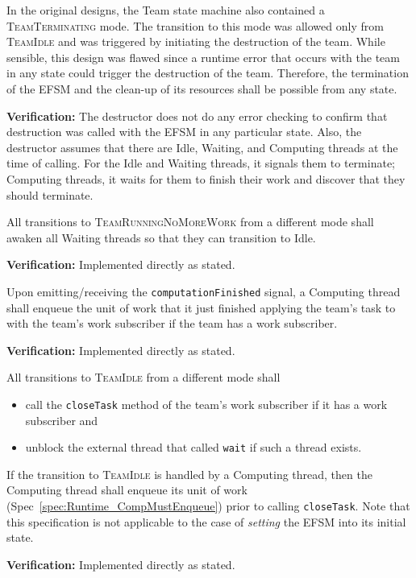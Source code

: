 \documentclass{article}
\newcommand{\TeamIdle}          {\textsc{TeamIdle}}
\newcommand{\TeamRunningNoMoreWork} {\textsc{TeamRunningNoMoreWork}}
\newcommand{\TeamTerminating}   {\textsc{TeamTerminating}}
\begin{document}
\begin{spec}
In the original designs, the Team state machine also contained a
{\TeamTerminating} mode.  The transition to this mode was allowed only from
{\TeamIdle} and was triggered by initiating the destruction of the team.  While
sensible, this design was flawed since a runtime error that occurs with the team
in any state could trigger the destruction of the team.  Therefore, the
termination of the EFSM and the clean-up of its resources shall be possible from
any state.
\end{spec}
\textbf{Verification:}\hspace{0.125in}  The destructor does not do any error
checking to confirm that destruction was called with the EFSM in any particular
state.  Also, the destructor assumes that there are Idle, Waiting, and Computing
threads at the time of calling.  For the Idle and Waiting threads, it signals 
them to terminate; Computing threads, it waits for them to finish their work and
discover that they should terminate.

\begin{spec}
\label{spec:Runtime_AwakenOnNoMoreWork}
All transitions to {\TeamRunningNoMoreWork} from a different mode shall awaken
all Waiting threads so that they can transition to Idle.
\end{spec}
\textbf{Verification:}\hspace{0.125in}  Implemented directly as stated.

\begin{spec}
\label{spec:Runtime_CompMustEnqueue}
Upon emitting/receiving the \texttt{computationFinished} signal, a Computing
thread shall enqueue the unit of work that it just finished applying the team's
task to with the team's work subscriber if the team has a work subscriber.
\end{spec}
\textbf{Verification:}\hspace{0.125in}  Implemented directly as stated.

\begin{spec}
\label{spec:Runtime_IdleOutput}
All transitions to {\TeamIdle} from a different mode shall
\begin{itemize}
\item{call the \texttt{closeTask} method of the team's work subscriber if it
has a work subscriber and }
\item{unblock the external thread that called \texttt{wait} if such a thread
exists.}
\end{itemize}
If the transition to {\TeamIdle} is handled by a Computing thread, then the
Computing thread shall enqueue its unit of work
(Spec~\ref{spec:Runtime_CompMustEnqueue}) prior to calling \texttt{closeTask}.
Note that this specification is not applicable to the case of \textit{setting}
the EFSM into its initial state.
\end{spec}
\textbf{Verification:}\hspace{0.125in}  Implemented directly as stated.
\end{document}
